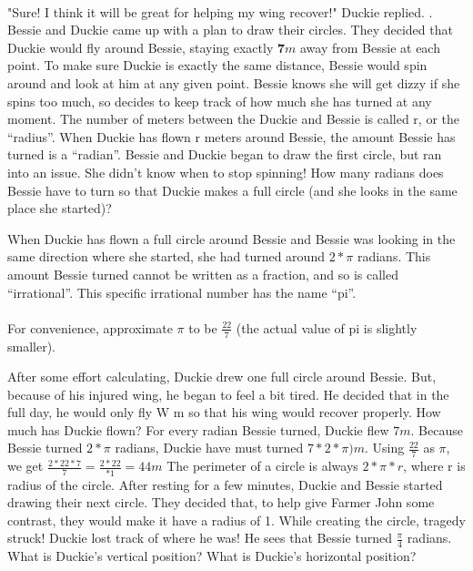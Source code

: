 \paragraph{} "Sure! I think it will be great for helping my wing recover!" Duckie replied.
\vfill.
\pagebreak
{}
{Bessie and Duckie came up with a plan to draw their circles. They decided that Duckie would fly around Bessie, staying exactly $\mathbf{7} m$ away from Bessie at each point. To make sure Duckie is exactly the same distance, Bessie would spin around and look at him at any given point. Bessie knows she will get dizzy if she spins too much, so decides to keep track of how much she has turned at any moment.}
{}
{The number of meters between the Duckie and Bessie is called r, or the “radius”. When Duckie has flown r meters around Bessie, the amount Bessie has turned is a “radian”.}
{}
{Bessie and Duckie began to draw the first circle, but ran into an issue. She didn't know when to stop spinning! How many radians does Bessie have to turn so that Duckie makes a full circle (and she looks in the same place she started)?}
{}
{When Duckie has flown a full circle around Bessie and Bessie was looking in the same direction where she started, she had turned around $2\ast\pi$ radians. This amount Bessie turned cannot be written as a fraction, and so is called “irrational”. This specific irrational number has the name “pi”. 
\paragraph{} For convenience, approximate $\pi$ to be $\frac{22}{7}$ (the actual value of pi is slightly smaller).}
{}
{After some effort calculating, Duckie drew one full circle around Bessie. But, because of his injured wing, he began to feel a bit tired. He decided that in the full day, he would only fly W m so that his wing would recover properly. How much has Duckie flown?}
{For every radian Bessie turned, Duckie flew $7 m$. Because Bessie turned $2\ast \pi$ radians, Duckie have must turned $7\ast 2\ast\pi) m$. Using $\frac{22}{7}$ as $\pi$, we get $\frac{2\ast 22\ast 7}{7}=\frac{2\ast 22}{\ast 1}=44 m$}
{The perimeter of a circle is always $2\ast\pi\ast r$, where r is radius of the circle.}
{}
{After resting for a few minutes, Duckie and Bessie started drawing their next circle. They decided that, to help give Farmer John some contrast, they would make it have a radius of 1. While creating the circle, tragedy struck! Duckie lost track of where he was! He sees that Bessie turned $\frac{\pi}{4}$ radians. What is Duckie's vertical position? What is Duckie's horizontal position?}
